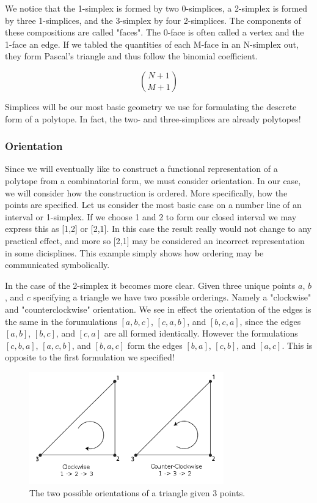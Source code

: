 We notice that the 1-simplex is formed by two 0-simplices, a 2-simplex is formed
by three 1-simplices, and the 3-simplex by four 2-simplices. The components of
these compositions are called "faces". The 0-face is often called a vertex
and the 1-face an edge. If we tabled the quantities of each M-face in an
N-simplex out, they form
Pascal's triangle and thus follow the binomial coefficient.

\begin{equation}
{N+1}\choose{M+1}
\end{equation}

Simplices will be our most basic geometry we use for formulating the descrete
form of a polytope. In fact, the two- and three-simplices are already
polytopes!

\subsubsection{Orientation}

Since we will eventually like to construct a functional representation
of a polytope from a combinatorial form, we must consider orientation.
In our case, we will consider how the construction is ordered. More
specifically, how the points are specified. Let us consider the most basic
case on a number line of an interval or 1-simplex. If we choose 1 and 2 to
form our closed interval we may express this as [1,2] or [2,1]. In this
case the result really would not change to any practical effect, and more so
[2,1] may be considered an incorrect representation in some dicisplines.
This example simply shows
how ordering may be communicated symbolically.

In the case of the 2-simplex it becomes more clear. Given three unique points
$a$, $b$, and $c$ specifying a triangle we have two possible orderings. Namely
a "clockwise" and "counterclockwise" orientation. We see in effect the orientation
of the edges is the same in the forumulations $[a,b,c]$, $[c,a,b]$, and $[b,c,a]$,
since the edges $[a,b]$, $[b,c]$, and $[c,a]$ are all formed identically.
However the formulations $[c,b,a]$, $[a,c,b]$, and $[b,a,c]$ form the edges
$[b,a]$, $[c,b]$, and $[a,c]$. This is opposite to the first formulation we
specified!

\begin{figure}[h!]
  \centering
    \includegraphics[width=0.75\textwidth]{img/Winding_order.png}
  \caption{The two possible orientations of a triangle given 3 points.}
  \label{fig:tri_orientation}
\end{figure}


